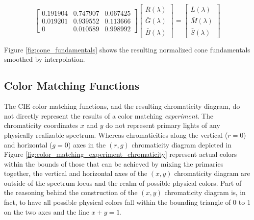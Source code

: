 \documentclass{article}
\begin{document}
\begin{multicols}{2}
\begin{equation} %
    \begin{bmatrix}
        0.191904&0.747907&0.067425\\
        0.019201&0.939552&0.113666\\
        0&0.010589&0.998992
    \end{bmatrix}\begin{bmatrix}
        \bar{R}(\lambda)\\
        \bar{G}(\lambda)\\
        \bar{B}(\lambda)
    \end{bmatrix}=\begin{bmatrix}
        \bar{L}(\lambda)\\
        \bar{M}(\lambda)\\
        \bar{S}(\lambda)
    \end{bmatrix}
\end{equation}

Figure \ref{fig:cone_fundamentals} shows the resulting normalized cone fundamentals smoothed by interpolation.

\subsection{Color Matching Functions} %

The CIE color matching functions, and the resulting chromaticity diagram, do not directly represent the results of a color matching \textit{experiment}.  The chromaticity coordinates $x$ and $y$ do not represent primary lights of any physically realizable spectrum.  Whereas chromaticities along the vertical ($r=0$) and horizontal ($g=0$) axes in the $(r,g)$ chromaticity diagram depicted in Figure \ref{fig:color_matching_experiment_chromaticity} represent actual colors within the bounds of those that can be achieved by mixing the primaries together, the vertical and horizontal axes of the $(x,y)$ chromaticity diagram are outside of the spectrum locus and the realm of possible physical colors.  Part of the reasoning behind the construction of the $(x,y)$ chromaticity diagram is, in fact, to have all possible physical colors fall within the bounding triangle of $0$ to $1$ on the two axes and the line $x+y=1$.


\end{multicols}
\end{document}
